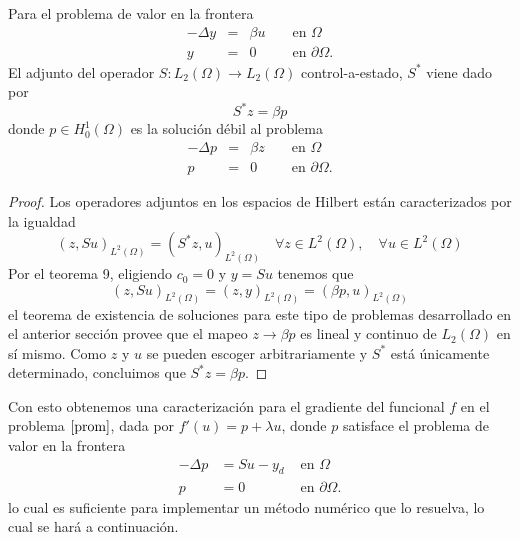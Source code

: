 \documentclass{article}
\begin{document}
\begin{theorem}
Para el problema de valor en la frontera 
\begin{equation}\begin{aligned}
-\Delta y &=& \beta u & & \text { en } \Omega \\
y &=& 0 & & \text { en } \partial \Omega .
\end{aligned}\end{equation}
El adjunto del operador $S:L_2(\Omega)\to L_2(\Omega) $ control-a-estado, $S^{*}$ viene dado por 
\begin{equation*}
    S^{*}z=\beta p
\end{equation*}
donde $p\in H_{0}^{1}(\Omega)$ es la solución débil al problema 
\begin{equation}\begin{aligned}
-\Delta p &=& \beta z & & \text { en } \Omega \\
p &=& 0 & & \text { en } \partial \Omega .
\end{aligned}\end{equation}
\end{theorem}
\begin{proof}
Los operadores adjuntos en los espacios de Hilbert están caracterizados por la igualdad
\begin{equation*}(z, S u)_{L^{2}(\Omega)}=\left(S^{*} z, u\right)_{L^{2}(\Omega)} \quad \forall z \in L^{2}(\Omega), \quad \forall u \in L^{2}(\Omega)\end{equation*}
Por el teorema 9, eligiendo $c_0=0$ y $y=Su$ tenemos que
\begin{equation*}(z, S u)_{L^{2}(\Omega)}=(z, y)_{L^{2}(\Omega)}=(\beta p, u)_{L^{2}(\Omega)}\end{equation*}
el teorema de existencia de soluciones para este tipo de problemas desarrollado en el anterior sección provee que el mapeo $z\to \beta p$ es lineal y continuo de $L_2(\Omega)$ en sí mismo. Como $z$ y $u$ se pueden escoger arbitrariamente y $S^{*}$ está únicamente determinado, concluimos que $S^{*}z=\beta p$. 
\end{proof}

\noindent
Con esto obtenemos una caracterización para el gradiente del funcional $f$ en el problema $\ref{prom}$, dada por $f'(u)=p +\lambda u$, donde $p$ satisface el problema de valor en la frontera
\begin{equation}\begin{aligned}
-\Delta p &= Su -y_d &  \text { en } \Omega \\
p &= 0 &  \text { en } \partial \Omega .
\end{aligned}\end{equation}
lo cual es suficiente para implementar un método numérico que lo resuelva, lo cual se hará a continuación.\\
\end{document}
